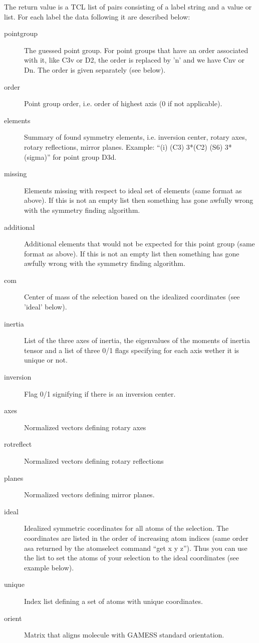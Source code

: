 \begin{itemize}
  The return value is a TCL list of pairs consisting of a label
  string and a value or list. For each label the data following
  it are described below:
  \begin{description}
  \item [pointgroup] The guessed point group. For point groups
    that have an order associated with it, like C3v or D2, the
    order is replaced by 'n' and we have Cnv or Dn. The order
    is given separately (see below).
  \item [order] Point group order, i.e. order of highest axis
    (0 if not applicable).
  \item [elements] Summary of found symmetry elements, i.e.
    inversion center, rotary axes, rotary reflections,
    mirror planes. Example: ``(i) (C3) 3*(C2) (S6) 3*(sigma)''
    for point group D3d.
  \item [missing] Elements missing with respect to ideal set
    of elements (same format as above). If this is not an empty
    list then something has gone awfully wrong with the symmetry
    finding algorithm.
  \item [additional] Additional elements that would not be
    expected for this point group (same format as above).
    If this is not an empty list then something has gone
    awfully wrong with the symmetry finding algorithm.
  \item [com] Center of mass of the selection based on the idealized
    coordinates (see 'ideal' below).
  \item [inertia] List of the three axes of inertia, the eigenvalues
    of the moments of inertia tensor and a list of three 0/1 flags 
    specifying for each axis wether it is unique or not.
  \item [inversion] Flag 0/1 signifying if there is an inversion center.
  \item [axes]       Normalized vectors defining rotary axes
  \item [rotreflect] Normalized vectors defining rotary reflections
  \item [planes]     Normalized vectors defining mirror planes.
  \item [ideal]  Idealized symmetric coordinates for all atoms of
    the selection. The coordinates are listed in the order of 
    increasing atom indices (same order asa returned by the
    atomselect command ``get {x y z}''). Thus you can use the list
    to set the atoms of your selection to the ideal coordinates
    (see example below).
  \item [unique] Index list defining a set of atoms with unique
    coordinates.
  \item [orient] Matrix that aligns molecule with GAMESS standard
    orientation.
  \end{description}


\end{itemize}
